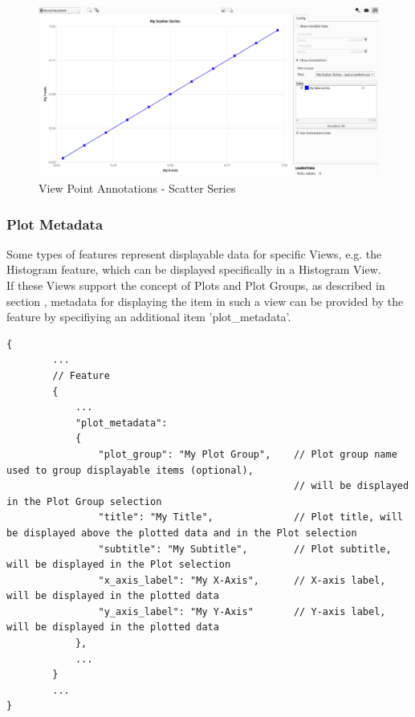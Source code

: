 \begin{figure}[H]
    \center
        \includegraphics[width=15cm]{figures/viewpoints_anno_example_scatter.png}
    \caption{View Point Annotations - Scatter Series} 
\end{figure}

\subsubsection{Plot Metadata}

Some types of features represent displayable data for specific Views, e.g. the Histogram feature,
which can be displayed specifically in a Histogram View. \\

If these Views support the concept of Plots and Plot Groups, as described in section ,
metadata for displaying the item in such a view can be provided by the feature by specifiying an additional item 'plot\_metadata'.

\begin{lstlisting}[basicstyle=\small\ttfamily]
{
        ...
        // Feature 
        {
            ...
            "plot_metadata": 
            {
                "plot_group": "My Plot Group",    // Plot group name used to group displayable items (optional), 
                                                  // will be displayed in the Plot Group selection
                "title": "My Title",              // Plot title, will be displayed above the plotted data and in the Plot selection
                "subtitle": "My Subtitle",        // Plot subtitle, will be displayed in the Plot selection
                "x_axis_label": "My X-Axis",      // X-axis label, will be displayed in the plotted data
                "y_axis_label": "My Y-Axis"       // Y-axis label, will be displayed in the plotted data
            },
            ...
        }
        ...
}
\end{lstlisting}

